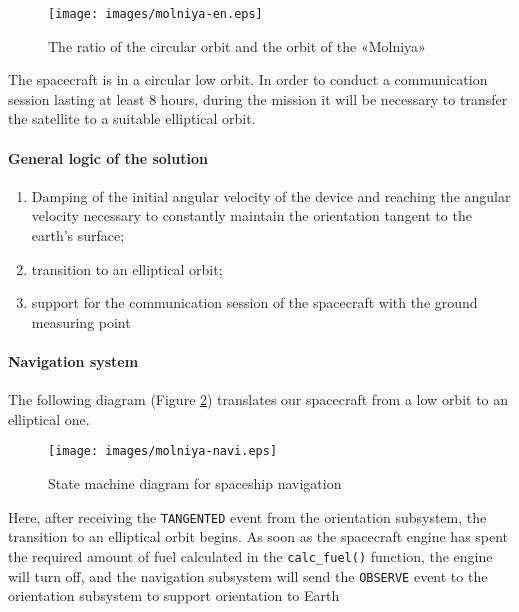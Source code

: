 \documentclass[12pt,a4paper]{article}
\begin{document}
\begin{figure}[tbh]
  \begin{center}
    \texttt{[image: images/molniya-en.eps]}
    \caption{The ratio of the circular orbit and the orbit of the «Molniya»}
    \label{Pic:Molniya-en}
  \end{center}
\end{figure}

The spacecraft is in a circular low orbit. In order to conduct a communication session lasting at least 8 hours, during the mission it will be necessary to transfer the satellite to a suitable elliptical
orbit.

\clearpage
\paragraph{General logic of the solution} 

\begin{enumerate}
\item Damping of the initial angular velocity of the device and reaching the angular velocity necessary to constantly maintain the orientation tangent to the earth's surface;
\item transition to an elliptical orbit;
\item support for the communication session of the spacecraft with the ground measuring point
\end{enumerate}

\paragraph{Navigation system} The following diagram (Figure \ref{Pic:Molniya-navi-en}) translates our spacecraft from a low orbit to an elliptical one.

\begin{figure}[tbh]
  \begin{center}
    \texttt{[image: images/molniya-navi.eps]}
    \caption{State machine diagram for spaceship navigation}
    \label{Pic:Molniya-navi-en}
  \end{center}
\end{figure}

Here, after receiving the \verb'TANGENTED' event from the orientation subsystem, the transition to an elliptical orbit begins. As soon as the spacecraft engine has spent the required amount of fuel calculated in the \verb'calc_fuel()' function, the engine will turn off, and the navigation subsystem will send the \verb'OBSERVE' event to the orientation subsystem to support orientation to Earth
\end{document}
